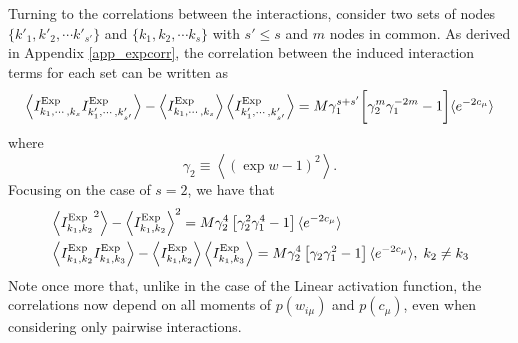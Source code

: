 \documentclass[11pt,letterpaper]{article}
\renewcommand{\red}[1]{#1}
\begin{document}
{\red Turning to the correlations between the interactions, consider} two sets of nodes $\{k'_1,k'_2, \cdots k'_{s'}\}$ and $\{k_1,k_2, \cdots k_s\}$ with $s'\le s$ and $m$ nodes in common. As derived in Appendix \ref{app_expcorr}, the correlation between the induced interaction terms for each set can be written as
\begin{equation}
\left \langle I^{\rm Exp}_{k_1,\cdots, k_s} I^{\rm Exp}_{k'_1,\cdots, k'_{s'}} \right \rangle - \left \langle I^{\rm Exp}_{k_1,\cdots, k_s} \right \rangle \left \langle I^{\rm Exp}_{k'_1,\cdots, k'_{s'}} \right \rangle   = M
\gamma_1^{s+s'} \biggl[ \gamma_2^m \gamma_1^{-2m}-1\biggr] \langle e^{-2c_{\mu}}\rangle
\label{exp_exact2}
\end{equation}
where 
\begin{equation}
\gamma_2 \equiv \left\langle \left(\exp w-1\right)^2\right\rangle.
\label{gamma2}
\end{equation}
Focusing on the case of $s=2$, we have that
\begin{eqnarray*}
&\left \langle {I^{\rm Exp}_{k_1,k_2}}^2 \right \rangle - \left \langle I^{\rm Exp}_{k_1,k_2} \right \rangle^2  = M \gamma^{4}_2 \left[\gamma^2_{2}\gamma^4_1-1\right] \langle e^{-2c_{\mu}}\rangle\\
&\left \langle I^{\rm Exp}_{k_1,k_2} I^{\rm Exp}_{k_1,k_3} \right \rangle - \left \langle I^{\rm Exp}_{k_1,k_2} \right\rangle \left\langle I^{\rm Exp}_{k_1,k_3} \right \rangle = M \gamma^{4}_2 \left[\gamma_{2}\gamma^2_1-1\right] \langle e^{-2c_{\mu}}\rangle, \; k_2\neq k_3
\end{eqnarray*}
Note once more that, unlike in the case of the Linear activation function, the correlations now depend on all moments of $p(w_{i\mu})$ and $p(c_{\mu})$, even when considering only pairwise interactions.
\end{document}
